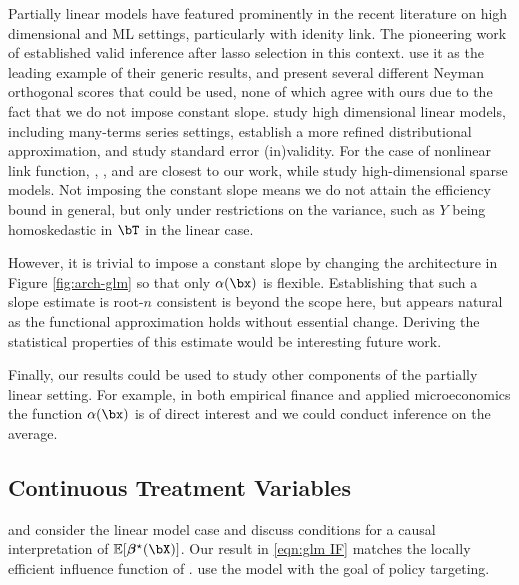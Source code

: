 \documentclass[12pt]{article}
\numberwithin{equation}{section}
\theoremstyle{definition}
\newcommand{\E}{\mathbb{E}}
\newcommand{\bbeta}{\boldsymbol{\beta}}
\newcommand{\bbtrue}{\bbeta^\star}
\begin{document}
\begin{appendices}
Partially linear models have featured prominently in the recent literature on high dimensional and ML settings, particularly with idenity link. The pioneering work of \cite{Belloni-Chernozhukov-Hansen2014_REStud} established valid inference after lasso selection in this context. \cite{Chernozhukov-etal2018_EJ} use it as the leading example of their generic results, and present several different Neyman orthogonal scores that could be used, none of which agree with ours due to the fact that we do not impose constant slope.
\cite{Cattaneo-Jansson-Newey2018_JASA} study high dimensional linear models, including many-terms series settings, establish a more refined distributional approximation, and study standard error (in)validity. For the case of nonlinear link function, \cite{Carroll-Fan-Gijbels-Wand1997_JASA}, \cite{Mammen-vandeGeer1997_AoS}, and \cite{Vansteelandt-Dukes2022_JRSSB} are closest to our work, while \cite{Belloni-Chernozhukov-Wei2016_JBES} study high-dimensional sparse models. Not imposing the constant slope means we do not attain the efficiency bound \citep{Mammen-vandeGeer1997_AoS,Vansteelandt-Dukes2022_JRSSB} in general, but only under restrictions on the variance, such as $Y$ being homoskedastic in $\bT$ in the linear case. 

However, it is trivial to impose a constant slope by changing the architecture in Figure \ref{fig:arch-glm} so that only $\alpha(\bx)$ is flexible. Establishing that such a slope estimate is root-$n$ consistent is beyond the scope here, but appears natural as the functional approximation holds without essential change. Deriving the statistical properties of this estimate would be interesting future work.

Finally, our results could be used to study other components of the partially linear setting. For example, in both empirical finance \cite{Cattaneo-Crump-Farrell-Schaumburg2020_REStat} and applied microeconomics \cite{Cattaneo-Crump-Farrell-Feng2024_AER} the function $\alpha(\bx)$ is of direct interest and we could conduct inference on the average.




\subsection{Continuous Treatment Variables}

\cite{Wooldridge2004_WP} and \cite{Graham-Pinto2022_JoE} consider the linear model case and discuss conditions for a causal interpretation of $\E[\bbtrue(\bX)]$. Our result in \eqref{eqn:glm IF} matches the locally efficient influence function of \cite{Graham-Pinto2022_JoE}. \cite{Chernozhukov-Demirer-Lewis-Syrgkanis2019_NIPS} use the model with the goal of policy targeting.


\end{appendices}
\end{document}

